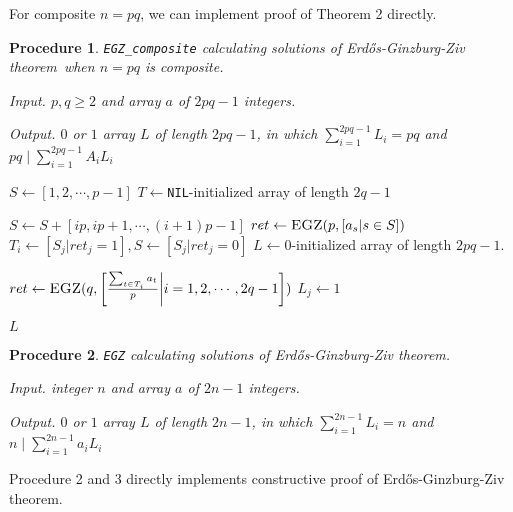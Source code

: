\documentclass[11pt]{article}
\newtheorem{procedure}{Procedure}
\newcommand{\EGZT}{Erd\H{o}s-Ginzburg-Ziv theorem}
\begin{document}
For composite $n = pq$, we can implement proof of Theorem 2 directly.

\begin{procedure} \texttt{EGZ\_composite} calculating solutions of \EGZT\ when $n=pq$ is composite.

Input. $p, q \ge 2$ and array $a$ of $2pq-1$ integers.

Output. $0$ or $1$ array $L$ of length $2pq-1$, in which $\sum_{i=1}^{2pq-1} {L}_{i} = pq$ and $pq \mid \sum_{i=1}^{2pq-1} {A}_{i}{L}_{i}$


\end{procedure}

\begin{algorithmic}[1]


    \State $S \gets [1, 2, \cdots, p-1]$
    \State $T \gets $\texttt{NIL}-initialized array of length $2q-1$
    
        \State $S \gets S + [ip, ip+1, \cdots, (i+1)p-1]$
        \State $ret \gets \Call{EGZ}{p, [a_s | s \in S]}$
        \State $T_i \gets [S_j | ret_j = 1], S \gets [S_j | ret_j = 0]$
    \EndFor
    \State $L \gets 0$-initialized array of length $2pq-1$.

    \State $ret \gets \Call{EGZ}{q, \left[\frac{\sum_{t \in T_i} a_t }{p} \middle| i = 1, 2, \cdots, 2q-1\right]}$
            \State $L_j \gets 1$
        \EndFor
    \EndFor
    
    \State \Return $L$
\EndFunction


\end{algorithmic}

\begin{procedure} \texttt{EGZ} calculating solutions of \EGZT.

Input. integer $n$ and array $a$ of $2n-1$ integers.

Output. $0$ or $1$ array $L$ of length $2n-1$, in which $\sum_{i=1}^{2n-1} {L}_{i} = n$ and $n \mid \sum_{i=1}^{2n-1} {a}_{i}{L}_{i}$


\end{procedure}

\begin{algorithmic}[1]

        \State \Return [1]
    \EndIf
    
            \State \Return {}
        \EndIf
    \EndFor
    
    \State \Return {}
\EndFunction


Procedure 2 and 3 directly implements constructive proof of \EGZT.


\end{algorithmic}
\end{document}
